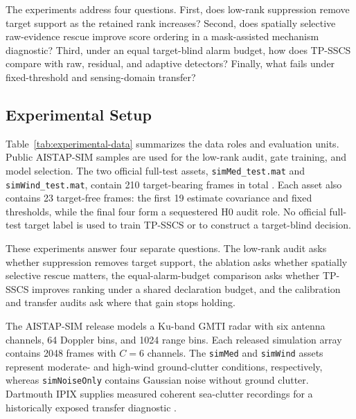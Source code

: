 \documentclass[journal]{IEEEtran}
\begin{document}
The experiments address four questions. First, does low-rank suppression remove target support as the retained rank increases? Second, does spatially selective raw-evidence rescue improve score ordering in a mask-assisted mechanism diagnostic? Third, under an equal target-blind alarm budget, how does TP-SSCS compare with raw, residual, and adaptive detectors? Finally, what fails under fixed-threshold and sensing-domain transfer?

\subsection{Experimental Setup}

Table~\ref{tab:experimental-data} summarizes the data roles and evaluation units. Public AISTAP-SIM samples are used for the low-rank audit, gate training, and model selection. The two official full-test assets, \texttt{simMed\_test.mat} and \texttt{simWind\_test.mat}, contain 210 target-bearing frames in total \cite{vega2024aistap}. Each asset also contains 23 target-free frames: the first 19 estimate covariance and fixed thresholds, while the final four form a sequestered H0 audit role. No official full-test target label is used to train TP-SSCS or to construct a target-blind decision.

These experiments answer four separate questions. The low-rank audit asks whether suppression removes target support, the ablation asks whether spatially selective rescue matters, the equal-alarm-budget comparison asks whether TP-SSCS improves ranking under a shared declaration budget, and the calibration and transfer audits ask where that gain stops holding.

The AISTAP-SIM release models a Ku-band GMTI radar with six antenna channels, 64 Doppler bins, and 1024 range bins. Each released simulation array contains 2048 frames with $C=6$ channels. The \texttt{simMed} and \texttt{simWind} assets represent moderate- and high-wind ground-clutter conditions, respectively, whereas \texttt{simNoiseOnly} contains Gaussian noise without ground clutter. Dartmouth IPIX supplies measured coherent sea-clutter recordings for a historically exposed transfer diagnostic \cite{haykin2002seaclutter,dewind2010database}.
\end{document}
